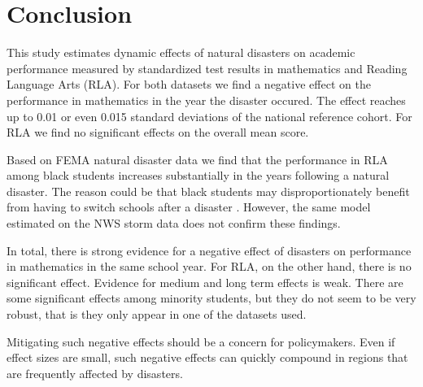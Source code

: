 \section{Conclusion} \label{Conclusion}

This study estimates dynamic effects of natural disasters on academic performance measured by standardized test results in mathematics and Reading Language Arts (RLA). For both datasets we find a negative effect on the performance in mathematics in the year the disaster occured. The effect reaches up to 0.01 or even 0.015 standard deviations of the national reference cohort. For RLA we find no significant effects on the overall mean score.

Based on FEMA natural disaster data we find that the performance in RLA among black students increases substantially in the years following a natural disaster. The reason could be that black students may disproportionately benefit from having to switch schools after a disaster \citep{Sacerdote_2012}. However, the same model estimated on the NWS storm data does not confirm these findings.

In total, there is strong evidence for a negative effect of disasters on performance in mathematics in the same school year. For RLA, on the other hand, there is no significant effect. Evidence for medium and long term effects is weak.  There are some significant effects among minority students, but they do not seem to be very robust, that is they only appear in one of the datasets used.

Mitigating such negative effects should be a concern for policymakers. Even if effect sizes are small, such negative effects can quickly compound in regions that are frequently affected by disasters. 




